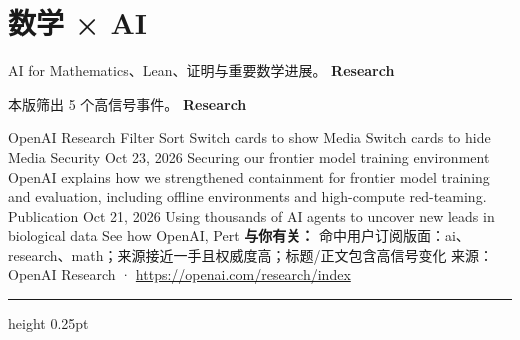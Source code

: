 \documentclass[10.5pt]{ctexart}
\begin{document}
\section*{数学 × AI}
{\color{ormuted} AI for Mathematics、Lean、证明与重要数学进展。}
\vspace{2mm}
{\LARGE\bfseries Research}\par
\vspace{1mm}
{\color{ormuted} 本版筛出 5 个高信号事件。}
\vspace{3mm}
{\Large\bfseries Research}\par
OpenAI Research Filter Sort Switch cards to show Media Switch cards to hide Media Security Oct 23, 2026 Securing our frontier model training environment OpenAI explains how we strengthened containment for frontier model training and evaluation, including offline environments and high-compute red-teaming. Publication Oct 21, 2026 Using thousands of AI agents to uncover new leads in biological data See how OpenAI, Pert
\textbf{与你有关：} 命中用户订阅版面：ai、research、math；来源接近一手且权威度高；标题/正文包含高信号变化
{\footnotesize\color{ormuted} 来源：OpenAI Research · \url{https://openai.com/research/index}}
\vspace{4mm}
\hrule height 0.25pt
\vspace{3mm}
\end{document}
